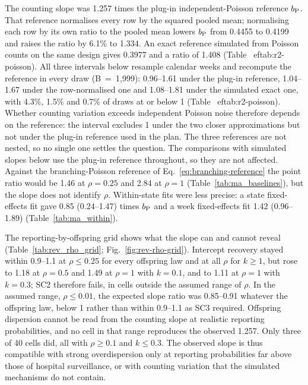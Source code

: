 The counting slope was 1.257 times the plug-in independent-Poisson reference $b_{\mathrm P}$. That reference normalises every row by the squared pooled mean; normalising each row by its own ratio to the pooled mean lowers $b_{\mathrm P}$ from 0.4455 to 0.4199 and raises the ratio by 6.1\% to 1.334. An exact reference simulated from Poisson counts on the same design gives 0.3977 and a ratio of 1.408 (Table~
ef{tab:r2-poisson}). All three intervals below resample calendar weeks and recompute the reference in every draw (B~=~1,999): 0.96--1.61 under the plug-in reference, 1.04--1.67 under the row-normalised one and 1.08--1.81 under the simulated exact one, with 4.3\%, 1.5\% and 0.7\% of draws at or below 1 (Table~
ef{tab:r2-poisson}). Whether counting variation exceeds independent Poisson noise therefore depends on the reference: the interval excludes 1 under the two closer approximations but not under the plug-in reference used in the plan. The three references are not nested, so no single one settles the question. The comparisons with simulated slopes below use the plug-in reference throughout, so they are not affected. Against the branching-Poisson reference of Eq.~\eqref{eq:branching-reference} the point ratio would be 1.46 at $\rho=0.25$ and 2.84 at $\rho=1$ (Table~\ref{tab:ma_baselines}), but the slope does not identify $\rho$. Within-state fits were less precise: a state fixed-effects fit gave 0.85 (0.24--1.47) times $b_{\mathrm P}$ and a week fixed-effects fit 1.42 (0.96--1.89) (Table~\ref{tab:ma_within}).

The reporting-by-offspring grid shows what the slope can and cannot reveal (Table~\ref{tab:rev_rho_grid}; Fig.~\ref{fig:rev-rho-grid}). Intercept recovery stayed within 0.9--1.1 at $\rho\le0.25$ for every offspring law and at all $\rho$ for $k\ge1$, but rose to 1.18 at $\rho=0.5$ and 1.49 at $\rho=1$ with $k=0.1$, and to 1.11 at $\rho=1$ with $k=0.3$; SC2 therefore fails, in cells outside the assumed range of $\rho$. In the assumed range, $\rho\le0.01$, the expected slope ratio was 0.85--0.91 whatever the offspring law, below 1 rather than within 0.9--1.1 as SC3 required. Offspring dispersion cannot be read from the counting slope at realistic reporting probabilities, and no cell in that range reproduces the observed 1.257. Only three of 40 cells did, all with $\rho\ge0.1$ and $k\le0.3$. The observed slope is thus compatible with strong overdispersion only at reporting probabilities far above those of hospital surveillance, or with counting variation that the simulated mechanisms do not contain.

